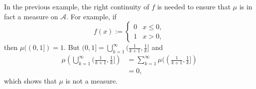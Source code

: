 \documentclass[../main.tex]{subfiles}
\begin{document}
\begin{remark}{}{}
In the previous example, the right continuity of $f$ is needed to ensure that $\mu$ is in fact a measure on $\mathcal{A}$. For example, if
\[ f(x) := \begin{cases} 0 & x \le 0, \\ 1 & x > 0, \end{cases} \]
then $\mu((0, 1]) = 1$. But $(0, 1] = \bigcup_{k=1}^{\infty} (\frac{1}{k+1}, \frac{1}{k}]$ and
\[\begin{aligned}
\mu\left(\bigcup_{k=1}^{\infty} (\frac{1}{k+1}, \frac{1}{k}]\right) &= \sum_{k=1}^{\infty} \mu((\frac{1}{k+1}, \frac{1}{k}]) \\
&= 0,
\end{aligned}\]
which shows that $\mu$ is not a measure.
\end{remark}
\end{document}
